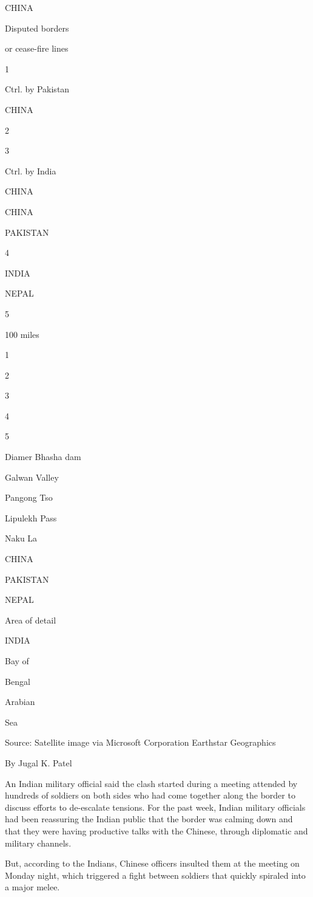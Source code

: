 CHINA

Disputed borders

or cease-fire lines

1

Ctrl. by Pakistan

CHINA

2

3

Ctrl. by India

CHINA

CHINA

PAKISTAN

4

INDIA

NEPAL

5

100 miles

1

2

3

4

5

Diamer Bhasha dam

Galwan Valley

Pangong Tso

Lipulekh Pass

Naku La

CHINA

PAKISTAN

NEPAL

Area of detail

INDIA

Bay of

Bengal

Arabian

Sea

Source: Satellite image via Microsoft Corporation Earthstar Geographics

By Jugal K. Patel

An Indian military official said the clash started during a meeting
attended by hundreds of soldiers on both sides who had come together
along the border to discuss efforts to de-escalate tensions. For the
past week, Indian military officials had been reassuring the Indian
public that the border was calming down and that they were having
productive talks with the Chinese, through diplomatic and military
channels.

But, according to the Indians, Chinese officers insulted them at the
meeting on Monday night, which triggered a fight between soldiers that
quickly spiraled into a major melee.

